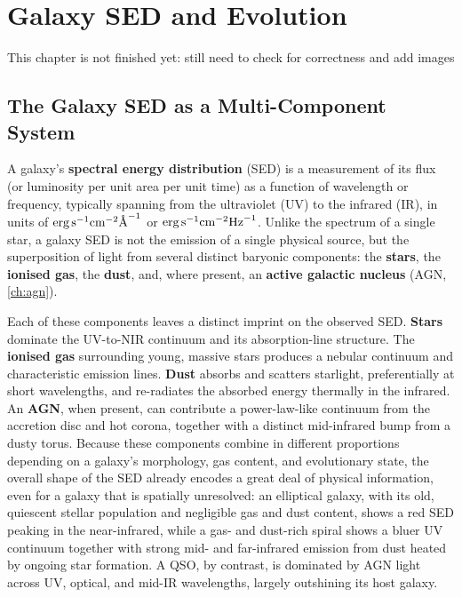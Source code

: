 \chapter{Galaxy SED and Evolution} \label{ch:galaxy_seds}

\begin{warningblock}
This chapter is not finished yet: still need to check for correctness and add images
\end{warningblock}

\section{The Galaxy SED as a Multi-Component System} \label{sec:galaxy_sed_intro}

\begin{minipage}{0.55\textwidth}
A galaxy's \textbf{spectral energy distribution} (SED) is a measurement of its flux (or luminosity per unit area per unit time) as a function of wavelength or frequency, typically spanning from the ultraviolet (UV) to the infrared (IR), in units of $\text{erg\,s}^{-1}\text{cm}^{-2}\text{\AA}^{-1}$ or $\text{erg\,s}^{-1}\text{cm}^{-2}\text{Hz}^{-1}$. Unlike the spectrum of a single star, a galaxy SED is not the emission of a single physical source, but the superposition of light from several distinct baryonic components: the \textbf{stars}, the \textbf{ionised gas}, the \textbf{dust}, and, where present, an \textbf{active galactic nucleus} (AGN, \cref{ch:agn}).
\end{minipage}%
\hfill
\begin{minipage}{0.4\textwidth}
    \centering
\end{minipage}

\medskip

Each of these components leaves a distinct imprint on the observed SED. \textbf{Stars} dominate the UV-to-NIR continuum and its absorption-line structure. The \textbf{ionised gas} surrounding young, massive stars produces a nebular continuum and characteristic emission lines. \textbf{Dust} absorbs and scatters starlight, preferentially at short wavelengths, and re-radiates the absorbed energy thermally in the infrared. An \textbf{AGN}, when present, can contribute a power-law-like continuum from the accretion disc and hot corona, together with a distinct mid-infrared bump from a dusty torus. Because these components combine in different proportions depending on a galaxy's morphology, gas content, and evolutionary state, the overall shape of the SED already encodes a great deal of physical information, even for a galaxy that is spatially unresolved: an elliptical galaxy, with its old, quiescent stellar population and negligible gas and dust content, shows a red SED peaking in the near-infrared, while a gas- and dust-rich spiral shows a bluer UV continuum together with strong mid- and far-infrared emission from dust heated by ongoing star formation. A QSO, by contrast, is dominated by AGN light across UV, optical, and mid-IR wavelengths, largely outshining its host galaxy.

